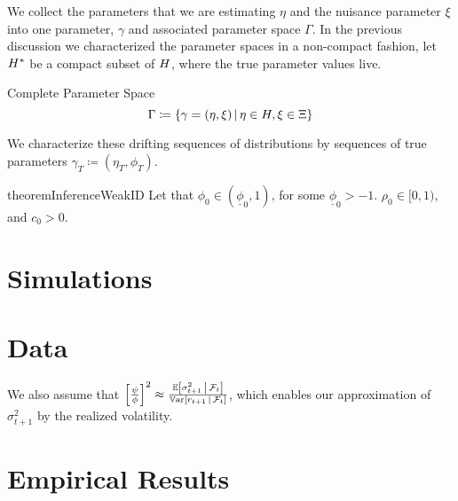 \documentclass[11pt, letterpaper, twoside, final]{article}
\begin{document}
We collect the parameters that we are estimating $\eta$ and the nuisance parameter $\xi$ into one parameter,
$\gamma$ and associated parameter space $\Gamma$.
In the previous discussion we characterized the parameter spaces in a non-compact fashion, let $H^{*}$ be a
compact subset of $H$, where the true parameter values live.

\begin{defn}{Complete Parameter Space}
    \begin{equation}
        \Gamma \coloneqq \left\lbrace \gamma = (\eta, \xi) \,\middle\vert\, \eta \in H, \xi \in \Xi \right\rbrace 
    \end{equation}
\end{defn}

We characterize these drifting sequences of distributions by sequences of true parameters $\gamma_T \coloneqq
(\eta_T, \phi_T)$.


\begin{restatable}{theorem}{InferenceWeakID}
    Let that $\phi_0  \in (\underline{\phi}_0,1)$, for some $\underline{\phi}_0 > -1$. 
    $\rho_0 \in [0,1)$, and $c_0 > 0$. 

\end{restatable}


\section{Simulations}

\section{Data}\label{sec:data}

We also assume that $\left[ \frac{\psi}{\phi} \right]^2 \approx \frac{\operatorname{\mathbb{E}} \left[\sigma^2_{t+1} \,\middle\vert\,
\mathcal{F}_t\right]}{\operatorname{\mathbb{V}ar}\left[r_{t+1} \,\middle\vert\, \mathcal{F}_t\right]}$, which enables our approximation of $\sigma^2_{t+1}$ by the
realized volatility.

\section{Empirical Results}
\end{document}
